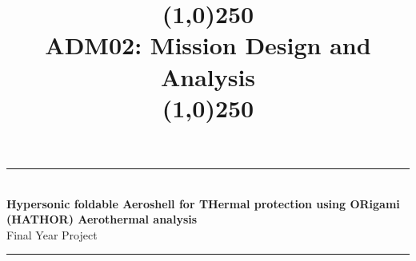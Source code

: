 \begin{titlepage}
\vspace*{-2cm}
\centerline{}
\vspace{2cm}

\centering

\vspace{-2cm}

\newcommand{\HRule}{\rule{\linewidth}{0.5mm}} %
 
\center %
 
 
 
 
 
\HRule \\[0.4cm]
{ \huge \bfseries Hypersonic foldable Aeroshell for THermal protection using ORigami (HATHOR) Aerothermal analysis}\\[0.4cm] %
{\large Final Year Project}
\HRule \\[3cm]
 
\title{\line(1,0){250}\\ADM02: Mission Design and Analysis\\\line(1,0){250}}
\vspace{-1.7cm} 

\centerline{}



\end{titlepage}

